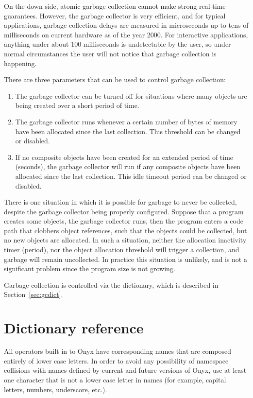 On the down side, atomic garbage collection cannot make strong real-time
guarantees.  However, the garbage collector is very efficient, and for typical
applications, garbage collection delays are measured in microseconds up to tens
of milliseconds on current hardware as of the year 2000.  For interactive
applications, anything under about 100 milliseconds is undetectable by the user,
so under normal circumstances the user will not notice that garbage collection
is happening.

There are three parameters that can be used to control garbage collection:
\begin{enumerate}
\item{The garbage collector can be turned off for situations where many objects
are being created over a short period of time.}
\item{The garbage collector runs whenever a certain number of bytes of memory
have been allocated since the last collection.  This threshold can be changed or
disabled.}
\item{If no composite objects have been created for an extended period of time
(seconds), the garbage collector will run if any composite objects have been
allocated since the last collection.  This idle timeout period can be changed or
disabled.}
\end{enumerate}

There is one situation in which it is possible for garbage to never be
collected, despite the garbage collector being properly configured.  Suppose
that a program creates some objects, the garbage collector runs, then the
program enters a code path that clobbers object references, such that the
objects could be collected, but no new objects are allocated.  In such a
situation, neither the allocation inactivity timer (period), nor the object
allocation threshold will trigger a collection, and garbage will remain
uncollected.  In practice this situation is unlikely, and is not a significant
problem since the program size is not growing.

Garbage collection is controlled via the 
dictionary, which is described in Section~\ref{sec:gcdict}.

\section{Dictionary reference}

All operators built in to Onyx have corresponding names that are composed
entirely of lower case letters.  In order to avoid any possibility of namespace
collisions with names defined by current and future versions of Onyx, use at
least one character that is not a lower case letter in names (for example,
capital letters, numbers, underscore, etc.).

